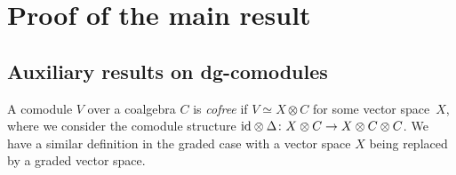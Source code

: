 \documentclass[10pt,russian]{article}
\theoremstyle{plain}
\theoremstyle{definition}
\newcommand{\id}{{\rm id}}
\begin{document}
\section{Proof of the main result}
\label{proof}

\subsection{Auxiliary results on dg-comodules}
\label{dg_comodules}

A comodule $V$ over a coalgebra $C$ is \emph{cofree} if $V\simeq X\otimes C$ for some vector space~$X$, where we consider the comodule structure ${\id\otimes\Delta\colon X\otimes C\to X\otimes C\otimes C}$. We have a similar definition in the graded case with a vector space $X$ being replaced by a graded vector space.
\end{document}
